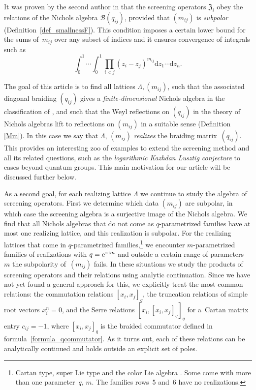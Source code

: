 \documentclass[pdftex]{sigma}%
\numberwithin{equation}{section}
\renewcommand{\i}{\mathrm{i}}
\newcommand{\zem}{\mathfrak{Z}}
\begin{document}
 It was proven by the second author in \cite{Len17} that the screening operators $\zem_{i}$ obey the relations of the Nichols algebra $\mathcal{B}(q_{ij})$, provided that $(m_{ij})$ is \emph{subpolar} (Definition~\ref{def_smallnessF}). This condition imposes a certain lower bound for the sums of~$m_{ij}$ over any subset of indices and it ensures convergence of integrals such as
 \[\int_0^1\cdots\int_0^1 \prod_{i<j} (z_i-z_j)^{m_{ij}}\mathrm{d} z_1\cdots\mathrm{d}z_n.\]

The goal of this article is to find all lattices $\Lambda,(m_{ij})$, such that the associated diagonal braiding $(q_{ij})$ gives a \emph{finite-dimensional} Nichols algebra in the classification of \cite{Heck06}, and such that the Weyl reflections on $(q_{ij})$ in the theory of Nichols algebras lift to reflections on $(m_{ij})$ in a suitable sense (Definition \ref{Mm}). In this case we say that $\Lambda$, $(m_{ij})$ \emph{realizes} the braiding matrix~$(q_{ij})$. This provides an interesting zoo of examples to extend the screening method and all its related questions, such as the \emph{logarithmic Kazhdan Lusztig conjecture} to cases beyond quantum groups. This main motivation for our article will be discussed further below.

As a second goal, for each realizing lattice $\Lambda$ we continue to study the algebra of screening operators. First we determine which data $(m_{ij})$ are subpolar, in which case the screening algebra is a surjective image of the Nichols algebra. We find that all Nichols algebras that do not come as $q$-parametrized families have at most one realizing lattice, and this realization is subpolar. For the realizing lattices that come in $q$-parametrized families,\footnote{Cartan type, super Lie type and the color Lie algebra \cite[Table~1, row~6]{Hecklist}. Some come with more than one parameter~$q$, $m$. The families \cite{Heck06} rows~5 and~6 have no realizations.} we encounter $m$-parametrized families of realizations with $q={\rm e}^{\pi\i m}$ and outside a certain range of parameters~$m$ the subpolarity of~$(m_{ij})$ fails. In these situations we study the products of screening operators and their relations using analytic continuation. Since we have not yet found a general approach for this, we explicitly treat the most common relations: the commutation relations $[x_i,x_j]_q$, the truncation relations of simple root vectors $x_i^n=0$, and the Serre relations $[x_i,[x_i,x_j]_q]_q$ for a~Cartan matrix entry $c_{ij}=-1$, where $[x_i,x_j]_q$ is the braided commutator defined in formula~\eqref{formula_qcommutator}. As it turns out, each of these relations can be analytically continued and holds outside an explicit set of poles.
\end{document}
